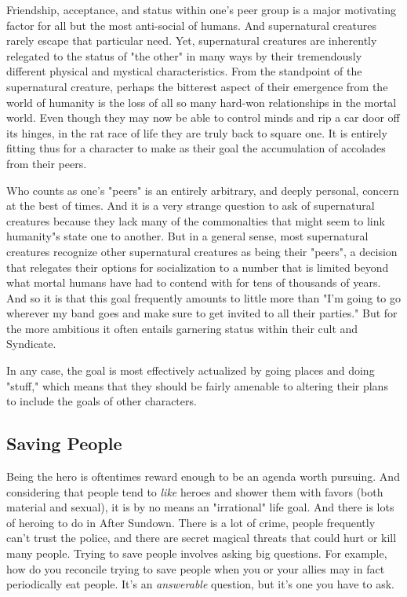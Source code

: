 Friendship, acceptance, and status within one's peer group is a major motivating factor for all but the most anti-social of humans. And supernatural creatures rarely escape that particular need. Yet, supernatural creatures are inherently relegated to the status of "the other" in many ways by their tremendously different physical and mystical characteristics. From the standpoint of the supernatural creature, perhaps the bitterest aspect of their emergence from the world of humanity is the loss of all so many hard-won relationships in the mortal world. Even though they may now be able to control minds and rip a car door off its hinges, in the rat race of life they are truly back to square one. It is entirely fitting thus for a character to make as their goal the accumulation of accolades from their peers.

Who counts as one's "peers" is an entirely arbitrary, and deeply personal, concern at the best of times. And it is a very strange question to ask of supernatural creatures because they lack many of the commonalties that might seem to link humanity"s state one to another. But in a general sense, most supernatural creatures recognize other supernatural creatures as being their "peers", a decision that relegates their options for socialization to a number that is limited beyond what mortal humans have had to contend with for tens of thousands of years. And so it is that this goal frequently amounts to little more than "I'm going to go wherever my band goes and make sure to get invited to all their parties." But for the more ambitious it often entails garnering status within their cult and Syndicate.

In any case, the goal is most effectively actualized by going places and doing "stuff," which means that they should be fairly amenable to altering their plans to include the goals of other characters.

\subsection{Saving People}

Being the hero is oftentimes reward enough to be an agenda worth pursuing. And considering that people tend to \textit{like} heroes and shower them with favors (both material and sexual), it is by no means an "irrational" life goal. And there is lots of heroing to do in After Sundown. There is a lot of crime, people frequently can't trust the police, and there are secret magical threats that could hurt or kill many people. Trying to save people involves asking big questions. For example, how do you reconcile trying to save people when you or your allies may in fact periodically eat people. It's an \textit{answerable} question, but it's one you have to ask.

